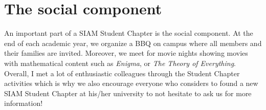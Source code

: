 \documentclass{article}
\begin{document}
 \section*{The social component}
%  
 An important part of a SIAM Student Chapter is the social component. At the end of each academic year, we organize a BBQ on campus where all members and their families are invited. Moreover, we meet for movie nights showing movies with mathematical content such as \textit{Enigma}, or \textit{The Theory of Everything}. Overall, I met a lot of enthusiastic colleagues through the Student Chapter activities which is why we also encourage everyone who considers to found a new SIAM Student Chapter at his/her university to not hesitate to ask us for more information!
\end{document}
